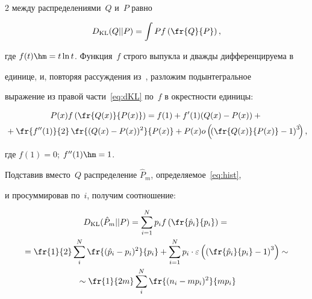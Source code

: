 \begin{multicols}{2}
между распределениями~$Q$ и~$P$ равно

\begin{equation}

\label{eq:dKL}

D_{\KL}(Q||P) = \int P{f}\left(\fr{Q}{P}\right),

\end{equation}

где $f(t) \hm= t\ln{t}$. Функция~$f$ строго выпукла и дваж\-ды дифференцируема в

единице, и, повторяя рассуждения из~\cite{scizar2004}, разложим подынтегральное

выражение из правой части~\eqref{eq:dKL} по~$f$ в окрестности единицы:

\begin{multline*}

P(x)f\left(\fr{Q(x)}{P(x)}\right) = f(1) + f'(1)(Q(x) - P(x)) + {}\\

{}+

\fr{f''(1)}{2}\,\fr{(Q(x)-P(x))^2}{P(x)} + P(x)o\left(\!\left(\fr{Q(x)}{P(x)} -

1\right)^3\!\right),

\end{multline*}

где $f(1) = 0$;  $f''(1) \hm= 1$.

Подставив вместо~$Q$ распределение $\hat{P}_m$, определяемое~\eqref{eq:hist},

и просуммировав по~$i$, получим соотношение:



\noindent

\begin{multline*}

D_{\KL}(\hat{P}_m||P)  = \sum\limits_{i = 1}^{N}p_i{f}\left(

\fr{\hat{p}_i}{p_i}\right) ={}\\

{} = \fr{1}{2}\sum\limits_i^{N}\fr{(\hat{p}_i - p_i)^2}{p_i} +

\sum\limits_{i = 1}^{N}p_i\cdot

\varepsilon\left(\left(\fr{\hat{p}_i}{p_i} - 1\right)^3\right)\sim{}\\

{}\sim

\fr{1}{2m}\sum\limits_i^{N}\fr{(n_i - mp_i)^2}{mp_i}

\end{multline*}


\end{multicols}
